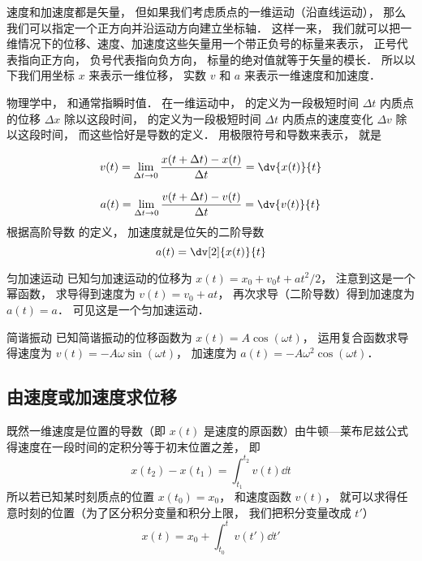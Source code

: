 

速度和加速度都是矢量， 但如果我们考虑质点的一维运动（沿直线运动）， 那么我们可以指定一个正方向并沿运动方向建立坐标轴． 这样一来， 我们就可以把一维情况下的位移、速度、加速度这些矢量用一个带正负号的标量来表示， 正号代表指向正方向， 负号代表指向负方向， 标量的绝对值就等于矢量的模长． 所以以下我们用坐标 $x$ 来表示一维位移， 实数 $v$ 和 $a$ 来表示一维速度和加速度．

物理学中， 和通常指瞬时值． 在一维运动中， 的定义为一段极短时间 $\Delta t$ 内质点的位移 $\Delta x$ 除以这段时间， 的定义为一段极短时间 $\Delta t$ 内质点的速度变化 $\Delta v$ 除以这段时间， 而这些恰好是导数的定义． 用极限符号和导数来表示， 就是

\begin{equation}
v(t) = \lim_{\Delta t\to 0} \frac{x(t+\Delta t) - x(t)}{\Delta t} = \dv{x(t)}{t}
\end{equation}

\begin{equation}
a(t) = \lim_{\Delta t\to 0} \frac{v(t+\Delta t) - v(t)}{\Delta t} = \dv{v(t)}{t}
\end{equation}
根据高阶导数%
的定义， 加速度就是位矢的二阶导数
\begin{equation}
a(t) = \dv[2]{x(t)}{t}
\end{equation}

\begin{example}{匀加速运动}
已知匀加速运动的位移为 $x(t) = x_0 + v_0 t + a t^2/2$， 注意到这是一个幂函数， 求导得到速度为 $v(t) = v_0 + a t$， 再次求导（二阶导数）得到加速度为 $a(t) = a$． 可见这是一个匀加速运动．
\end{example}

\begin{example}{简谐振动}
已知简谐振动的位移函数为 $x(t) = A\cos(\omega t)$， 运用复合函数求导%
得速度为 $v(t) = -A\omega\sin(\omega t)$， 加速度为 $a(t) = -A\omega^2\cos(\omega t)$．
\end{example}


\subsection{由速度或加速度求位移}
既然一维速度是位置的导数（即 $x(t)$ 是速度的原函数）由牛顿—莱布尼兹公式得速度在一段时间的定积分等于初末位置之差， 即
\begin{equation}\label{VnA1_eq4}
x(t_2) - x(t_1) = \int_{t_1}^{t_2} v(t) \dd{t}
\end{equation}
所以若已知某时刻质点的位置 $x(t_0) = x_0$， 和速度函数 $v(t)$， 就可以求得任意时刻的位置（为了区分积分变量和积分上限， 我们把积分变量改成 $t'$）
\begin{equation}\label{VnA1_eq5}
x(t) = x_0 + \int_{t_0}^t v(t') \dd{t'}
\end{equation}

